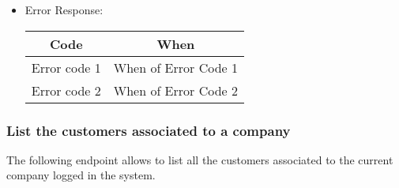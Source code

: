 \begin{itemize}
    \item Error Response:
    \begin{table}[!h]
    \centering 
    \begin{tabular}{|c|c|}
    \hline
    \multicolumn{1}{|c|}{\textbf{Code}} & \multicolumn{1}{c|}{\textbf{When}} \\ \hline
    Error code 1 & When of Error Code 1 \\\hline
    Error code 2 & When of Error Code 2 \\\hline
    \end{tabular} 
    \end{table} 
    
\end{itemize}


\subsubsection*{List the customers associated to a company}

The following endpoint allows to list all the customers associated to the current company logged in the system.

